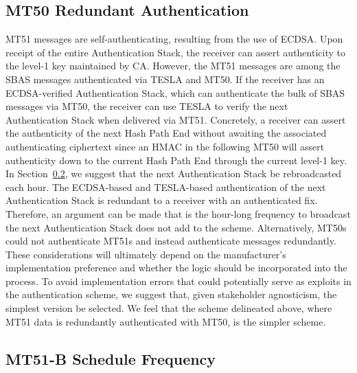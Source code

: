 \documentclass[letterpaper,times]{IONconf/IONconf}
\begin{document}
	\subsection{MT50 Redundant Authentication} \label{sub:mt50_redundant_authentication}

		MT51 messages are self-authenticating, resulting from the use of ECDSA.
		Upon receipt of the entire Authentication Stack, the receiver can assert authenticity to the level-1 key maintained by CA.
		However, the MT51 messages are among the SBAS messages authenticated via TESLA and MT50.
		If the receiver has an ECDSA-verified Authentication Stack, which can authenticate the bulk of SBAS messages via MT50, the receiver can use TESLA to verify the next Authentication Stack when delivered via MT51.
		Concretely, a receiver can assert the authenticity of the next Hash Path End without awaiting the associated authenticating ciphertext since an HMAC in the following MT50 will assert authenticity down to the current Hash Path End through the current level-1 key.
		In Section~\ref{sub:mt51_schedule_frequency}, we suggest that the next Authentication Stack be rebroadcasted each hour.
		The ECDSA-based and TESLA-based authentication of the next Authentication Stack is redundant to a receiver with an authenticated fix.
		Therefore, an argument can be made that is the hour-long frequency to broadcast the next Authentication Stack does not add to the scheme.
		Alternatively, MT50s could not authenticate MT51s and instead authenticate messages redundantly.
		These considerations will ultimately depend on the manufacturer's implementation preference and whether the logic should be incorporated into the process.
		To avoid implementation errors that could potentially serve as exploits in the authentication scheme, we suggest that, given stakeholder agnosticism, the simplest version be selected.
		We feel that the scheme delineated above, where MT51 data is redundantly authenticated with MT50, is the simpler scheme.

	\subsection{MT51-B Schedule Frequency} \label{sub:mt51_schedule_frequency}
\end{document}
